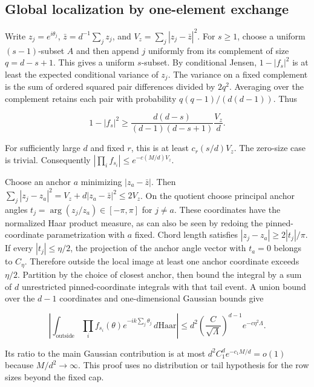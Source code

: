 \subsection{Global localization by one-element exchange}

Write $z_j=e^{i\theta_j}$, $\bar z=d^{-1}\sum_jz_j$, and $V_z=\sum_j|z_j-\bar z|^2$. For $s\ge1$, choose a uniform $(s-1)$-subset $A$ and then append $j$ uniformly from its complement of size $q=d-s+1$. This gives a uniform $s$-subset. By conditional Jensen, $1-|f_s|^2$ is at least the expected conditional variance of $z_j$. The variance on a fixed complement is the sum of ordered squared pair differences divided by $2q^2$. Averaging over the complement retains each pair with probability $q(q-1)/(d(d-1))$. Thus

\begin{equation*}
1-|f_s|^2\ge\frac{d(d-s)}{(d-1)(d-s+1)}\frac{V_z}{d}.
\end{equation*}

For sufficiently large $d$ and fixed $r$, this is at least $c_r(s/d)V_z$. The zero-size case is trivial. Consequently $|\prod_i f_{s_i}|\le e^{-c(M/d)V_z}$.

Choose an anchor $a$ minimizing $|z_a-\bar z|$. Then $\sum_j|z_j-z_a|^2=V_z+d|z_a-\bar z|^2\le2V_z$. On the quotient choose principal anchor angles $t_j=\arg(z_j/z_a)\in[-\pi,\pi]$ for $j\ne a$. These coordinates have the normalized Haar product measure, as can also be seen by redoing the pinned-coordinate parametrization with $a$ fixed. Chord length satisfies $|z_j-z_a|\ge 2|t_j|/\pi$. If every $|t_j|\le\eta/2$, the projection of the anchor angle vector with $t_a=0$ belongs to $C_\eta$. Therefore outside the local image at least one anchor coordinate exceeds $\eta/2$. Partition by the choice of closest anchor, then bound the integral by a sum of $d$ unrestricted pinned-coordinate integrals with that tail event. A union bound over the $d-1$ coordinates and one-dimensional Gaussian bounds give

\begin{equation*}
\left|\int_{\mathrm{outside}}\prod_i f_{s_i}(\theta)e^{-ik\sum_j\theta_j}\,d\mathrm{Haar}\right|
\le d^2 \left(\frac{C}{\sqrt{\Lambda}}\right)^{d-1}e^{-c\eta^2\Lambda}.
\end{equation*}

Its ratio to the main Gaussian contribution is at most $d^2 C_1^d e^{-c_1 M/d}=o(1)$ because $M/d^2\to\infty$. This proof uses no distribution or tail hypothesis for the row sizes beyond the fixed cap.
